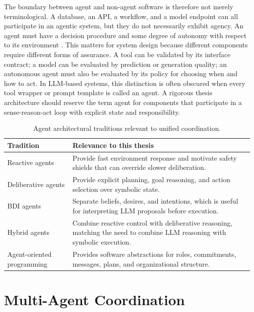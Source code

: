 The boundary between agent and non-agent software is therefore not merely terminological. A database, an API, a workflow, and a model endpoint can all participate in an agentic system, but they do not necessarily exhibit agency. An agent must have a decision procedure and some degree of autonomy with respect to its environment \cite{franklin1997agent}. This matters for system design because different components require different forms of assurance. A tool can be validated by its interface contract; a model can be evaluated by prediction or generation quality; an autonomous agent must also be evaluated by its policy for choosing when and how to act. In LLM-based systems, this distinction is often obscured when every tool wrapper or prompt template is called an agent. A rigorous thesis architecture should reserve the term agent for components that participate in a sense-reason-act loop with explicit state and responsibility.

\begin{table}[htbp]
\centering
\caption{Agent architectural traditions relevant to unified coordination.}
\label{tab:agent-architectures}
\begin{tabular}{p{}p{}}
\toprule
\textbf{Tradition} & \textbf{Relevance to this thesis} \\
\midrule
Reactive agents & Provide fast environment response and motivate safety shields that can override slower deliberation. \\
Deliberative agents & Provide explicit planning, goal reasoning, and action selection over symbolic state. \\
BDI agents & Separate beliefs, desires, and intentions, which is useful for interpreting LLM proposals before execution. \\
Hybrid agents & Combine reactive control with deliberative reasoning, matching the need to combine LLM reasoning with symbolic execution. \\
Agent-oriented programming & Provides software abstractions for roles, commitments, messages, plans, and organizational structure. \\
\bottomrule
\end{tabular}
\end{table}

\section{Multi-Agent Coordination}

